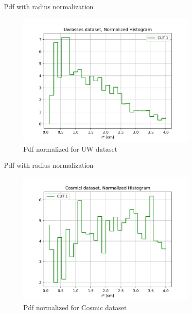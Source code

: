 \documentclass[9pt]{beamer}
\begin{document}
\begin{frame}{Pdf with radius normalization}

\begin{figure}[hbtp]
\centering
\includegraphics[width = 0.8\textwidth]{NormalizedUW.pdf}
\caption{Pdf normalized for UW dataset}
\end{figure}
\end{frame}

\begin{frame}{Pdf with radius normalization}

\begin{figure}[hbtp]
\centering
\includegraphics[width = 0.8\textwidth]{NormalizedBK.pdf}
\caption{Pdf normalized for Cosmic dataset}
\end{figure}
\end{frame}
\end{document}
